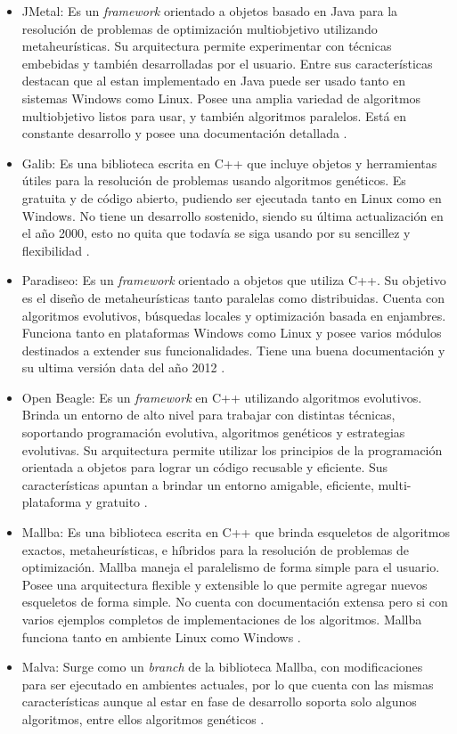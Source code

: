 \begin{itemize}
	\item JMetal: Es un \emph{framework} orientado a objetos basado en Java para la resolución de problemas de optimización multiobjetivo utilizando metaheurísticas. Su arquitectura permite experimentar con técnicas embebidas y también desarrolladas por el usuario. Entre sus características destacan que al estan implementado en Java puede ser usado tanto en sistemas Windows como Linux. Posee una amplia variedad de algoritmos multiobjetivo listos para usar, y también algoritmos paralelos. Está en constante desarrollo y posee una documentación detallada \citep{Jmetal}.
	
	\item Galib: Es una biblioteca escrita en C++ que incluye objetos y herramientas útiles para la resolución de problemas usando algoritmos genéticos. Es gratuita y de código abierto, pudiendo ser ejecutada tanto en Linux como en Windows. No tiene un desarrollo sostenido, siendo su última actualización en el año 2000, esto no quita que todavía se siga usando por su sencillez y flexibilidad \citep{Galib}.
	
	\item Paradiseo: Es un \emph{framework} orientado a objetos que utiliza C++. Su objetivo es el diseño de metaheurísticas tanto paralelas como distribuidas. Cuenta con algoritmos evolutivos, búsquedas locales y optimización basada en enjambres. Funciona tanto en plataformas Windows como Linux y posee varios módulos destinados a extender sus funcionalidades. Tiene una buena documentación y su ultima versión data del año 2012 \citep{Paradiseo}.
	
	\item Open Beagle: Es un \emph{framework} en C++ utilizando algoritmos evolutivos. Brinda un entorno de alto nivel para trabajar con distintas técnicas, soportando programación evolutiva, algoritmos genéticos y estrategias evolutivas. Su arquitectura permite utilizar los principios de la programación orientada a objetos para lograr un código recusable y eficiente. Sus características apuntan a brindar un entorno amigable, eficiente, multi-plataforma y gratuito \citep{OpenBeagle}.
	
	\item Mallba: Es una biblioteca escrita en C++ que brinda esqueletos de algoritmos exactos, metaheurísticas, e híbridos para la resolución de problemas de optimización. Mallba maneja el paralelismo de forma simple para el usuario. Posee una arquitectura flexible y extensible lo que permite agregar nuevos esqueletos de forma simple. No cuenta con documentación extensa pero si con varios ejemplos completos de implementaciones de los algoritmos. Mallba funciona tanto en ambiente Linux como Windows \citep{Mallba}.
	
	\item Malva: Surge como un \emph{branch} de la biblioteca Mallba, con modificaciones para ser ejecutado en ambientes actuales, por lo que cuenta con las mismas características aunque al estar en fase de desarrollo soporta solo algunos algoritmos, entre ellos algoritmos genéticos \citep{Malva}.
\end{itemize}


